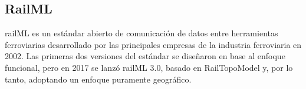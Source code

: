 \subsection{RailML}

    railML es un estándar abierto de comunicación de datos entre herramientas ferroviarias desarrollado por las principales empresas de la industria ferroviaria en 2002. Las primeras dos versiones del estándar se diseñaron en base al enfoque funcional, pero en 2017 se lanzó railML 3.0, basado en RailTopoModel y, por lo tanto, adoptando un enfoque puramente geográfico.


